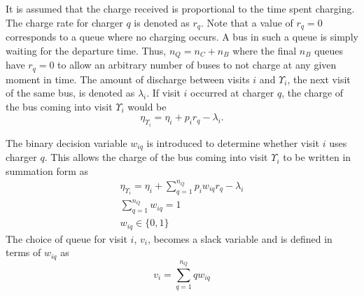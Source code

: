 \documentclass[utf8]{FrontiersinHarvard}
\begin{document}

It is assumed that the charge received is proportional to the time spent charging. The charge rate for charger $q$ is
denoted as $r_q$. Note that a value of $r_q = 0$ corresponds to a queue where no charging occurs. A bus in such a queue is simply waiting for the departure time. Thus, $n_Q = n_C + n_B$ where the final $n_B$ queues have $r_q = 0$ to allow an arbitrary number of buses to not charge at any given moment in time. The amount of discharge between visits $i$ and $\Upsilon_i$, the next visit of the same bus, is denoted as $\lambda_i$. If visit $i$ occurred at charger $q$, the charge of the bus coming into visit $\Upsilon_i$ would be
\begin{equation}
	\eta_{\Upsilon_i} = \eta_i + p_i r_q - \lambda_i.
\end{equation}

The binary decision variable $w_{iq}$ is introduced to determine whether visit $i$ uses charger $q$. This allows the
charge of the bus coming into visit $\Upsilon_i$ to be written in summation form as
\begin{subequations}
    \label{subeq:pre_next_charge}
\begin{align}
    \eta_{\Upsilon_i} = \eta_i + \sum_{q=1}^{n_Q} p_i w_{iq} r_q - \lambda_i  \\
    \sum_{q=1}^{n_Q} w_{iq} = 1 \\
    w_{iq} \in \{0,1\}
\end{align}
\end{subequations}
The choice of queue for visit $i$, $v_i$, becomes a slack variable and is defined in terms of $w_{iq}$ as
\begin{equation}
    v_i = \sum_{q=1}^{n_Q} qw_{iq}
\end{equation}
\end{document}
